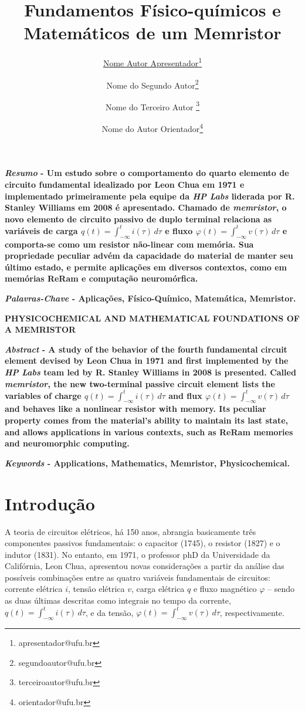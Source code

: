 \documentclass{ceel}
\title{Fundamentos Físico-químicos e Matemáticos de um Memristor}
\author[1]{\underline{Nome Autor Apresentador}\thanks{apresentador@ufu.br}}
\author[1]{Nome do Segundo Autor\thanks{segundoautor@ufu.br}}
\author[1]{Nome do Terceiro Autor \thanks{terceiroautor@ufu.br}}
\author[2]{Nome do Autor Orientador\thanks{orientador@ufu.br}}
\affil[1]{FEELT - Universidade Federal de Uberlândia}
\affil[2]{FEELT - Professor Adjunto - Universidade Federal de Uberlândia}
\begin{document}
\inserirtitulo

\begin{multicols}{2}

\textbf{\emph{Resumo} - Um estudo sobre o comportamento do quarto elemento de circuito fundamental idealizado por Leon Chua em 1971 e implementado primeiramente pela equipe da \emph{HP Labs} liderada por R. Stanley Williams em 2008 é apresentado. Chamado de \emph{memristor}, o novo elemento de circuito passivo de duplo terminal relaciona as variáveis de carga $q(t)=\int_{-\infty}^t i(\tau)\, d\tau$ e fluxo $\varphi(t)=\int_{-\infty}^t v(\tau)\, d\tau$ e comporta-se como um resistor não-linear com memória. Sua propriedade peculiar advém da capacidade do material de manter seu último estado, e permite aplicações em diversos contextos, como em memórias ReRam e computação neuromórfica.} %
\vspace*{10pt}

\textbf{\emph{Palavras-Chave} - Aplicações, Físico-Químico, Matemática, Memristor.}


\begin{center}

\noindent\textbf{\large \uppercase{Physicochemical and Mathematical Foundations of a Memristor}}
\end{center}

\textbf{\emph{Abstract} - A study of the behavior of the fourth fundamental circuit element devised by Leon Chua in 1971 and first implemented by the \emph{HP Labs} team led by R. Stanley Williams in 2008 is presented. Called \emph {memristor}, the new two-terminal passive circuit element lists the variables of charge $q(t)=\int_{-\infty}^t i(\tau)\, d\tau$ and flux $\varphi(t)=\int_{-\infty}^t v(\tau)\, d\tau$ and behaves like a nonlinear resistor with memory. Its peculiar property comes from the material's ability to maintain its last state, and allows applications in various contexts, such as ReRam memories and neuromorphic computing.}
\vspace*{10pt}

\textbf{\emph{Keywords} - Applications, Mathematics, Memristor, Physicochemical.}


\section{Introdução}
A teoria de circuitos elétricos, há 150 anos, abrangia basicamente três componentes passivos fundamentais: o capacitor (1745), o resistor (1827) e o indutor (1831). No entanto, em 1971, o professor phD da Universidade da Califórnia, Leon Chua, apresentou novas considerações a partir da análise das possíveis combinações entre as quatro variáveis fundamentais de circuitos: corrente elétrica $i$, tensão elétrica $v$, carga elétrica $q$ e fluxo magnético $\varphi$ – sendo as duas últimas descritas como integrais no tempo da corrente, $q(t)=\int_{-\infty}^t i(\tau)\, d\tau$, e da tensão, $\varphi(t)=\int_{-\infty}^t v(\tau)\, d\tau$, respectivamente.


\end{multicols}
\end{document}
